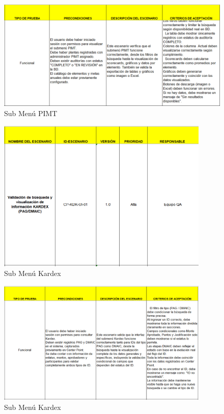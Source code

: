 \documentclass[12pt,letterpaper,spanish, xcolor=table]{report}
\numberwithin{figure}{subsection}
\begin{document}
	\begin{figure}[H]
		\centering
		\includegraphics[width=1.0\textwidth]
		{Imagenes/CenterPoint/EPIMT2.png}
		\caption{Sub Menú PIMT}\label{a3}
	\end{figure}
	
	\begin{figure}[H]
		\centering
		\includegraphics[width=0.9\textwidth]
		{Imagenes/CenterPoint/EKardex.png}
		\caption{Sub Menú Kardex}\label{a3}
	\end{figure}
	
	\begin{figure}[H]
		\centering
		\includegraphics[width=0.9\textwidth]
		{Imagenes/CenterPoint/EKardex2.png}
		\caption{Sub Menú Kardex}\label{a3}
	\end{figure}
	
\end{document}
